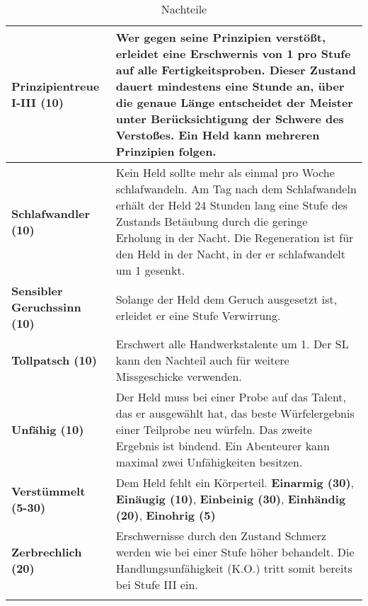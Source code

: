 \begin{longtable}{|p{5cm}|p{11cm}|}
\textbf{Prinzipientreue I-III (10)} & Wer gegen seine Prinzipien verstößt, erleidet eine Erschwernis von 1 pro Stufe auf alle Fertigkeitsproben. Dieser Zustand dauert mindestens eine Stunde an, über die genaue Länge entscheidet der Meister unter Berücksichtigung der Schwere des Verstoßes. Ein Held kann mehreren Prinzipien folgen. \\ \hline

\textbf{Schlafwandler (10)} & Kein Held sollte mehr als einmal pro Woche schlafwandeln. Am Tag nach dem Schlafwandeln erhält der Held 24 Stunden lang eine Stufe des Zustands Betäubung durch die geringe Erholung in der Nacht. Die Regeneration ist für den Held in der Nacht, in der er schlafwandelt um 1 gesenkt. \\ \hline

\textbf{Sensibler Geruchssinn (10)} & Solange der Held dem Geruch ausgesetzt ist, erleidet er eine Stufe Verwirrung. \\ \hline

\textbf{Tollpatsch (10)} & Erschwert alle Handwerkstalente um 1. Der SL kann den Nachteil auch für weitere Missgeschicke verwenden. \\ \hline

\textbf{Unfähig (10)} & Der Held muss bei einer Probe auf das Talent, das er ausgewählt hat, das beste Würfelergebnis einer Teilprobe neu würfeln. Das zweite Ergebnis ist bindend. Ein Abenteurer kann maximal zwei Unfähigkeiten besitzen. \\ \hline

\textbf{Verstümmelt (5-30)} & Dem Held fehlt ein Körperteil. \textbf{Einarmig (30)}, \textbf{Einäugig (10)}, \textbf{Einbeinig (30)}, \textbf{Einhändig (20)}, \textbf{Einohrig (5)} \\ \hline

\textbf{Zerbrechlich (20)} & Erschwernisse durch den Zustand Schmerz werden wie bei einer Stufe höher behandelt. Die Handlungsunfähigkeit (K.O.) tritt somit bereits bei Stufe III ein. \\ \hline

\caption{Nachteile}
\label{tab:Nachteile}
\end{longtable}